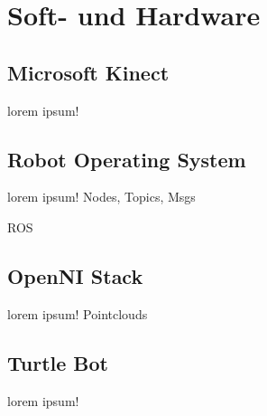 \section{Soft- und Hardware}
\label{sec:softundhardware}



\subsection{Microsoft Kinect}
{\color{red}lorem ipsum!}

\subsection{Robot Operating System}
{\color{red}lorem ipsum!}
Nodes, Topics, Msgs

\gls{ROS}

\subsection{OpenNI Stack}
{\color{red}lorem ipsum!}
Pointclouds

\subsection{Turtle Bot}
{\color{red}lorem ipsum!}